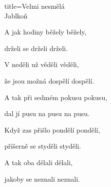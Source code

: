 \begin{song}{title=\centering Velmi nesmělá \\\normalsize Jablkoň  \vspace*{-0.3cm}}
{\begin{minipage}[t]{0.48\textwidth}
	A jak hodiny běžely běžely,
	
	drželi se drželi drželi.

\end{minipage}\begin{minipage}[t]{0.48\textwidth}\setlength{\parindent}{0.45cm}\vspace*{0.55cm}  %

	
\sloka
	V neděli už věděli věděli,

	že jsou možná dospělí dospělí.
	
	A tak při sedmém pokusu pokusu,
	
	dal jí pusu na pusu na pusu.


\sloka
	Když zas přišlo pondělí pondělí,
	
	příšerně se styděli styděli.
	
	A tak oba dělali dělali,
	
	jakoby se neznali neznali.

\end{minipage}
}
\setcounter{Slokočet}{0}
\end{song}
